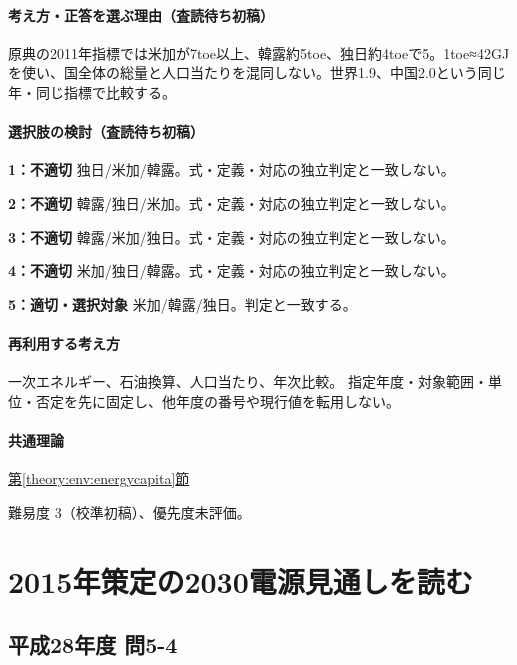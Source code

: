 \paragraph{考え方・正答を選ぶ理由（査読待ち初稿）} 原典の2011年指標では米加が7toe以上、韓露約5toe、独日約4toeで5。1toe≈42GJを使い、国全体の総量と人口当たりを混同しない。世界1.9、中国2.0という同じ年・同じ指標で比較する。

\paragraph{選択肢の検討（査読待ち初稿）}\mbox{}\par

\noindent\textbf{1：不適切} 独日/米加/韓露。式・定義・対応の独立判定と一致しない。\par

\noindent\textbf{2：不適切} 韓露/独日/米加。式・定義・対応の独立判定と一致しない。\par

\noindent\textbf{3：不適切} 韓露/米加/独日。式・定義・対応の独立判定と一致しない。\par

\noindent\textbf{4：不適切} 米加/独日/韓露。式・定義・対応の独立判定と一致しない。\par

\noindent\textbf{5：適切・選択対象} 米加/韓露/独日。判定と一致する。\par

\paragraph{再利用する考え方} 一次エネルギー、石油換算、人口当たり、年次比較。 指定年度・対象範囲・単位・否定を先に固定し、他年度の番号や現行値を転用しない。

\paragraph{共通理論} \hyperref[theory:env:energycapita]{第\ref*{theory:env:energycapita}節}

\par 難易度 3（校準初稿）、優先度未評価。

\section{2015年策定の2030電源見通しを読む}

\subsection{平成28年度 問5-4}
\label{q:h28-reg-basic-5-4}

